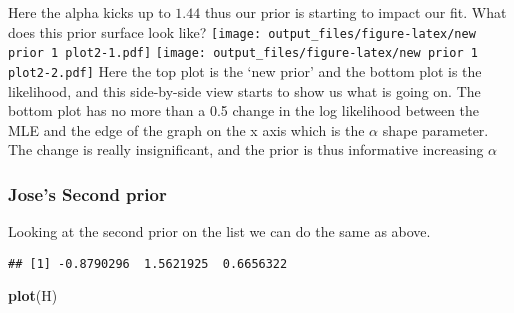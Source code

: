 \documentclass[]{article}
\newenvironment{Shaded}{\begin{snugshade}}{\end{snugshade}}
\newcommand{\DataTypeTok}[1]{\textcolor[rgb]{0.13,0.29,0.53}{#1}}
\newcommand{\DecValTok}[1]{\textcolor[rgb]{0.00,0.00,0.81}{#1}}
\newcommand{\FloatTok}[1]{\textcolor[rgb]{0.00,0.00,0.81}{#1}}
\newcommand{\KeywordTok}[1]{\textcolor[rgb]{0.13,0.29,0.53}{\textbf{#1}}}
\newcommand{\NormalTok}[1]{#1}
\newcommand{\OperatorTok}[1]{\textcolor[rgb]{0.81,0.36,0.00}{\textbf{#1}}}
\newcommand{\StringTok}[1]{\textcolor[rgb]{0.31,0.60,0.02}{#1}}
\begin{document}
Here the alpha kicks up to \(1.44\) thus our prior is starting to impact
our fit. What does this prior surface look like?
\texttt{[image: output\_files/figure-latex/new prior 1 plot2-1.pdf]}
\texttt{[image: output\_files/figure-latex/new prior 1 plot2-2.pdf]} Here
the top plot is the `new prior' and the bottom plot is the likelihood,
and this side-by-side view starts to show us what is going on. The
bottom plot has no more than a 0.5 change in the log likelihood between
the MLE and the edge of the graph on the x axis which is the \(\alpha\)
shape parameter. The change is really insignificant, and the prior is
thus informative increasing \(\alpha\)

\hypertarget{joses-second-prior}{%
\subsubsection{Jose's Second prior}\label{joses-second-prior}}

Looking at the second prior on the list we can do the same as above.

\begin{Shaded}
\end{Shaded}

\begin{verbatim}
## [1] -0.8790296  1.5621925  0.6656322
\end{verbatim}

\begin{Shaded}
\begin{Highlighting}[]
\KeywordTok{plot}\NormalTok{(H)}
\end{Highlighting}
\end{Shaded}
\end{document}
